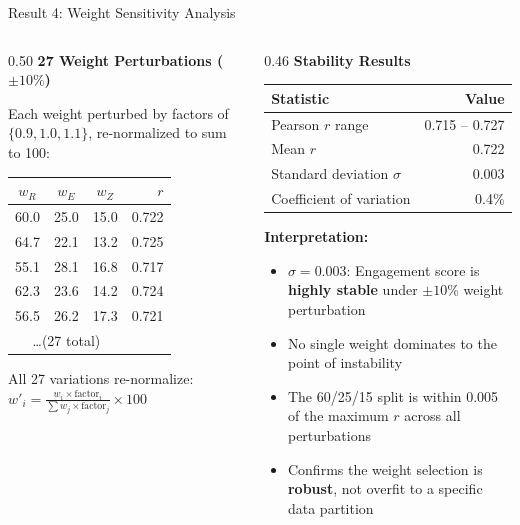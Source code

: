 \documentclass[aspectratio=169,10pt]{beamer}
\begin{document}
\begin{frame}{Result 4: Weight Sensitivity Analysis}
\begin{columns}[T]
\begin{column}{0.50\textwidth}
\textbf{27 Weight Perturbations ($\pm 10\%$)}

\vspace{4pt}
\footnotesize
Each weight perturbed by factors of $\{0.9, 1.0, 1.1\}$, re-normalized to sum to 100:

\vspace{4pt}
\begin{center}
\scriptsize
\begin{tabular}{@{}cccr@{}}
\toprule
$w_R$ & $w_E$ & $w_Z$ & $r$ \\
\midrule
60.0 & 25.0 & 15.0 & 0.722 \\
64.7 & 22.1 & 13.2 & 0.725 \\
55.1 & 28.1 & 16.8 & 0.717 \\
62.3 & 23.6 & 14.2 & 0.724 \\
56.5 & 26.2 & 17.3 & 0.721 \\
\multicolumn{3}{c}{\ldots (27 total)} & \\
\bottomrule
\end{tabular}
\end{center}

\vspace{4pt}
\footnotesize
All 27 variations re-normalize: $w'_i = \frac{w_i \times \text{factor}_i}{\sum w_j \times \text{factor}_j} \times 100$
\end{column}

\begin{column}{0.46\textwidth}
\textbf{Stability Results}

\vspace{6pt}
\footnotesize
\begin{tabular}{@{}lr@{}}
\toprule
\textbf{Statistic} & \textbf{Value} \\
\midrule
Pearson $r$ range & 0.715 -- 0.727 \\
Mean $r$ & 0.722 \\
Standard deviation $\sigma$ & 0.003 \\
Coefficient of variation & 0.4\% \\
\bottomrule
\end{tabular}

\vspace{8pt}
\textbf{Interpretation:}
\begin{itemize}\scriptsize
  \item $\sigma = 0.003$: Engagement score is \textbf{highly stable} under $\pm 10\%$ weight perturbation
  \item No single weight dominates to the point of instability
  \item The 60/25/15 split is within 0.005 of the maximum $r$ across all perturbations
  \item Confirms the weight selection is \textbf{robust}, not overfit to a specific data partition
\end{itemize}


\end{column}
\end{columns}
\end{frame}
\end{document}
